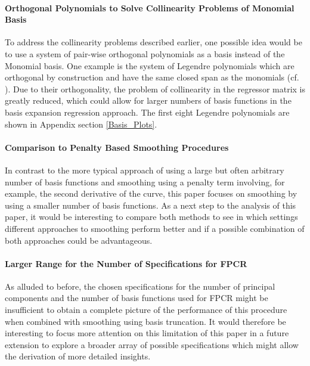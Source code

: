 \documentclass[11pt,twoside,a4paper]{article}
\begin{document}
	\paragraph{Orthogonal Polynomials to Solve Collinearity Problems of Monomial Basis}
	To address the collinearity problems described earlier, one possible idea would be to use a system of pair-wise orthogonal polynomials as a basis instead of the Monomial basis. One example is the system of Legendre polynomials which are orthogonal by construction and have the same closed span as the monomials (cf. \cite{Dattoli_2001}). Due to their orthogonality, the problem of collinearity in the regressor matrix is greatly reduced, which could allow for larger numbers of basis functions in the basis expansion regression approach. The first eight Legendre polynomials are shown in Appendix section \ref{Basis_Plots}.
	\vspace{-0.2cm}
	
	\paragraph{Comparison to Penalty Based Smoothing Procedures}
	In contrast to the more typical approach of using a large but often arbitrary number of basis functions and smoothing using a penalty term involving, for example, the second derivative of the curve, this paper focuses on smoothing by using a smaller number of basis functions. As a next step to the analysis of this paper, it would be interesting to compare both methods to see in which settings different approaches to smoothing perform better and if a possible combination of both approaches could be advantageous.
	\vspace{-0.2cm}
	
	\paragraph{Larger Range for the Number of Specifications for FPCR}
	As alluded to before, the chosen specifications for the number of principal components and the number of basis functions used for FPCR might be insufficient to obtain a complete picture of the performance of this procedure when combined with smoothing using basis truncation. It would therefore be interesting to focus more attention on this limitation of this paper in a future extension to explore a broader array of possible specifications which might allow the derivation of more detailed insights.
	\vspace{-0.2cm}
	
\end{document}
